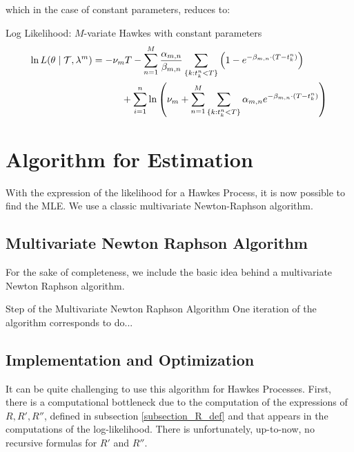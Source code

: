 which in the case of constant parameters, reduces to:

\begin{theoreme}[label = thrm:ln-like]{Log Likelihood: $M$-variate Hawkes with constant parameters}
\begin{align}
\ln L( \theta \mid \mathcal{T}, \lambda^{m} ) &= - \nu_m T  - \sum_{n = 1}^M \frac{\alpha_{m,n}}{ \beta_{m,n} } \sum_{ \{k: t_k^n < T \}} \left ( 1 - e^{- \beta_{m,n} \cdot ( T - t_k^n ) }  \right )  \notag
\\ & \quad \qquad + \sum_{i=1}^n  \ln \left ( 
\nu_m + \sum_{n = 1}^M \sum_{ \{k: t_k^n < T \}} \alpha_{m,n} e^{- \beta_{m,n} \cdot ( T - t_k^n ) }
\right ) 
\end{align}
\end{theoreme}







\section{Algorithm for Estimation}
With the expression of the likelihood for a Hawkes Process, it is now possible to find the MLE. We use a classic multivariate Newton-Raphson algorithm. 

\subsection{Multivariate Newton Raphson Algorithm}
For the sake of completeness, we include the basic idea behind a multivariate Newton Raphson algorithm. 



\begin{theoreme}{Step of the Multivariate Newton Raphson Algorithm}
One iteration of the algorithm corresponds to do...
\end{theoreme}

\subsection{Implementation and Optimization}
\label{subsection:challenge}
It can be quite challenging to use this algorithm for Hawkes Processes. First, there is a computational bottleneck due to the computation of the expressions of $R, R', R''$, defined in subsection \ref{subsection_R_def} and that appears in the computations of the log-likelihood. There is unfortunately, up-to-now, no recursive formulas for $R'$ and $R''$. 

